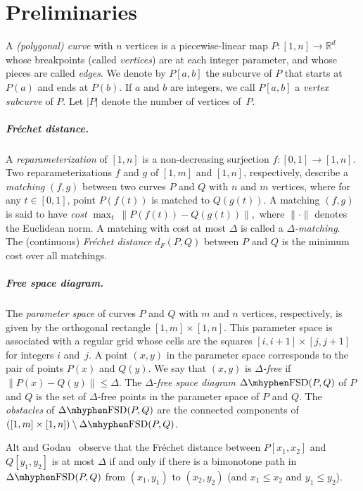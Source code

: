 \documentclass[a4paper,UKenglish,cleveref,thm-restate,notab]{lipics-v2021}
\newcommand{\f}{Fr\'echet\xspace}
\newcommand{\dF}{\ensuremath{d_F}}
\newcommand{\FSD}[1][\Delta'] {\ensuremath{#1}\mhyphen\mathrm{FSD}}
\newcommand{\from}{\colon}
\newcommand{\R}{\mathbb{R}}
\begin{document}
\section{Preliminaries}

    A \emph{(polygonal) curve} with $n$ vertices is a piecewise-linear map $P\from[1,n]\to\R^d$ whose breakpoints (called \emph{vertices}) are at each integer parameter, and whose pieces are called \emph{edges}.
    We denote by $P[a, b]$ the subcurve of $P$ that starts at $P(a)$ and ends at $P(b)$.
    If $a$ and $b$ are integers, we call $P[a,b]$ a \emph{vertex subcurve} of $P$.
    Let $|P|$ denote the number of vertices of~$P$.

\subparagraph*{\f distance.}
    A \emph{reparameterization} of $[1, n]$ is a non-decreasing surjection $f \from [0, 1] \to [1, n]$.
    Two reparameterizations $f$ and $g$ of $[1, m]$ and $[1, n]$, respectively, describe a \emph{matching} $(f, g)$ between two curves $P$ and $Q$ with $n$ and $m$ vertices, where for any $t \in [0, 1]$, point $P(f(t))$ is matched to $Q(g(t))$.
    A matching $(f, g)$ is said to have \emph{cost} $
        \max_t~\lVert P(f(t)) - Q(g(t)) \rVert,$  where $\lVert \cdot \rVert$ denotes the Euclidean norm.
    A matching with cost at most $\Delta$ is called a \emph{$\Delta$-matching}.
    The (continuous) \emph{\f distance} $\dF(P, Q)$ between $P$ and $Q$ is the minimum cost over all matchings.
    
\subparagraph*{Free space diagram.}
    The \emph{parameter space} of curves $P$ and $Q$ with $m$ and $n$ vertices, respectively, is given by the orthogonal rectangle $[1, m] \times [1, n]$.
    This parameter space is associated with a regular grid whose cells are the squares $[i, i+1] \times [j, j+1]$ for integers $i$ and~$j$.
    A point $(x, y)$ in the parameter space corresponds to the pair of points $P(x)$ and $Q(y)$.
    We say that $(x, y)$ is \emph{$\Delta$-free} if $\lVert P(x) - Q(y) \rVert \leq \Delta$.
    The \emph{$\Delta$-free space diagram} $\FSD[\Delta](P, Q)$ of $P$ and $Q$ is the set of $\Delta$-free points in the parameter space of $P$ and $Q$.
    The \emph{obstacles} of $\FSD[\Delta](P, Q)$ are the connected components of $([1, m] \times [1, n]) \setminus \FSD[\Delta](P, Q)$.

    Alt and Godau~\cite{alt95continuous_frechet} observe that the \f distance between $P[x_1, x_2]$ and $Q[y_1, y_2]$ is at most $\Delta$ if and only if there is a bimonotone path in $\FSD[\Delta](P, Q)$ from $(x_1, y_1)$ to $(x_2, y_2)$ (and $x_1 \leq x_2$ and $y_1 \leq y_2$).
    
\end{document}

